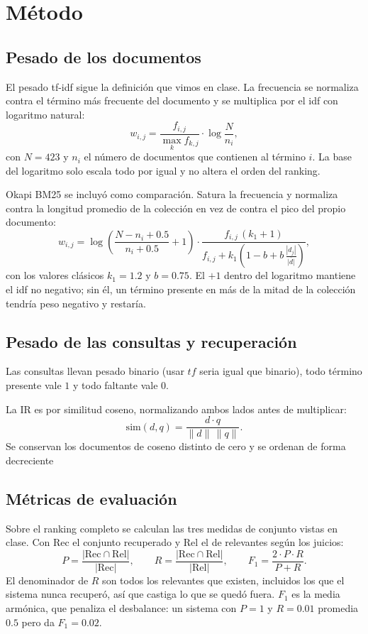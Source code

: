 \documentclass[11pt,letterpaper]{article}
\begin{document}
\section{Método}

\subsection*{Pesado de los documentos}

El pesado tf-idf sigue la definición que vimos en clase. La frecuencia se
normaliza contra el término más frecuente del documento y se multiplica
por el idf con logaritmo natural:
\[
    w_{i,j} = \frac{f_{i,j}}{\max_k f_{k,j}}
              \cdot \log \frac{N}{n_i} ,
\]
con $N = 423$ y $n_i$ el número de documentos que contienen al término
$i$. La base del logaritmo solo escala todo por igual y no altera el
orden del ranking.

Okapi BM25 se incluyó como comparación. Satura la frecuencia y
normaliza contra la longitud promedio de la colección en vez de contra
el pico del propio documento:
\[
    w_{i,j} = \log\!\left(\frac{N - n_i + 0.5}{n_i + 0.5} + 1\right)
              \cdot
              \frac{f_{i,j}\,(k_1 + 1)}
                   {f_{i,j} + k_1\left(1 - b
                    + b\,\frac{|d_j|}{\overline{|d|}}\right)} ,
\]
con los valores clásicos $k_1 = 1.2$ y $b = 0.75$. El $+1$ dentro del
logaritmo mantiene el idf no negativo; sin él, un término presente en
más de la mitad de la colección tendría peso negativo y restaría.



\subsection*{Pesado de las consultas y recuperación}

Las consultas llevan pesado binario (usar $tf$ seria igual que binario), 
todo término presente vale $1$ y todo faltante vale $0$.

La IR es por similitud coseno, normalizando ambos lados
antes de multiplicar:
\[
    \mathrm{sim}(d, q) = \frac{d \cdot q}{\|d\|\,\|q\|} .
\]
Se conservan los documentos de coseno distinto de cero y se ordenan de
forma decreciente


\subsection*{Métricas de evaluación}

Sobre el ranking completo se calculan las tres medidas de conjunto
vistas en clase. Con $\mathrm{Rec}$ el conjunto recuperado y
$\mathrm{Rel}$ el de relevantes según los juicios:
\[
    P = \frac{|\mathrm{Rec} \cap \mathrm{Rel}|}{|\mathrm{Rec}|} ,
    \qquad
    R = \frac{|\mathrm{Rec} \cap \mathrm{Rel}|}{|\mathrm{Rel}|} ,
    \qquad
    F_1 = \frac{2 \cdot P \cdot R}{P + R} .
\]
El denominador de $R$ son todos los relevantes que existen, incluidos
los que el sistema nunca recuperó, así que castiga lo que se quedó
fuera. $F_1$ es la media armónica, que penaliza el desbalance: un
sistema con $P = 1$ y $R = 0.01$ promedia $0.5$ pero da
$F_1 = 0.02$.
\end{document}
